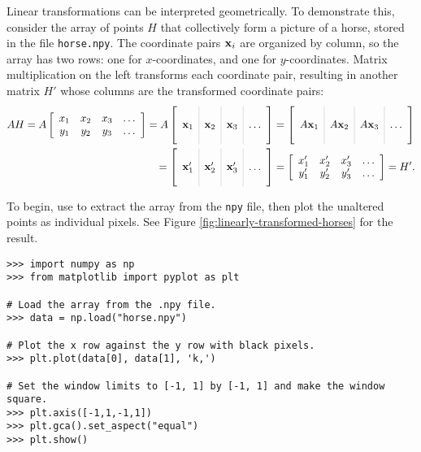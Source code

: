 Linear transformations can be interpreted geometrically.
To demonstrate this, consider the array of points $H$ that collectively form a picture of a horse, stored in the file \texttt{horse.npy}.
The coordinate pairs $\mathbf{x}_i$ are organized by column, so the array has two rows: one for $x$-coordinates, and one for $y$-coordinates.
Matrix multiplication on the left transforms each coordinate pair, resulting in another matrix $H'$ whose columns are the transformed coordinate pairs:
\begin{align*}
AH = A\left[\begin{array}{cccc}
x_1 & x_2 & x_3 & \ldots \\
y_1 & y_2 & y_3 & \ldots \\
\end{array}\right]
=
A\left[\begin{array}{c|c|c|c}
\arrayrulecolor{lightgray}
& & & \\
\x_1 & \x_2 & \x_3 & \ldots \\
& & &
\end{array}\right]
&=
\left[\begin{array}{c|c|c|c}
\arrayrulecolor{lightgray}
& & & \\
A\x_1 & A\x_2 & A\x_3 & \ldots \\
& & &
\end{array}\right]
\\ =
\left[\begin{array}{c|c|c|c}
\arrayrulecolor{lightgray}
& & & \\
\x_1' & \x_2' & \x_3' & \ldots \\
& & &
\end{array}\right]
&=
\left[\begin{array}{cccc}
x_1' & x_2' & x_3' & \ldots \\
y_1' & y_2' & y_3' & \ldots \\
\end{array}\right]
= H'.
\end{align*}

To begin, use  to extract the array from the \texttt{npy} file, then plot the unaltered points as individual pixels.
See Figure \ref{fig:linearly-transformed-horses} for the result.

\begin{lstlisting}
>>> import numpy as np
>>> from matplotlib import pyplot as plt

# Load the array from the .npy file.
>>> data = np.load("horse.npy")

# Plot the x row against the y row with black pixels.
>>> plt.plot(data[0], data[1], 'k,')

# Set the window limits to [-1, 1] by [-1, 1] and make the window square.
>>> plt.axis([-1,1,-1,1])
>>> plt.gca().set_aspect("equal")
>>> plt.show()
\end{lstlisting}

